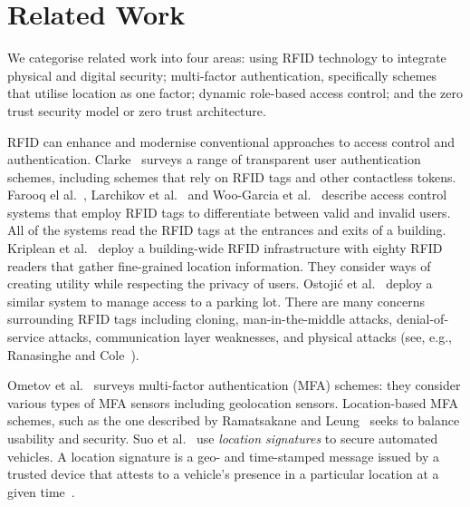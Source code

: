 \section{Related Work}\label{sec:related-work}

We categorise related work into four areas: using RFID technology to
integrate physical and digital security; multi-factor authentication,
specifically schemes that utilise location as one factor; dynamic
role-based access control; and the zero trust security model or zero
trust architecture.

RFID can enhance and modernise conventional approaches to access
control and authentication.  Clarke~\cite{clarke-11} surveys a range
of transparent user authentication schemes, including schemes that
rely on RFID tags and other contactless tokens.  Farooq el
al.~\cite{farooq-et-al-14}, Larchikov et al.~\cite{larchikov-et-al-14}
and Woo-Garcia et al.~\cite{woo-garcia-et-al-16} describe access
control systems that employ RFID tags to differentiate between valid
and invalid users.  All of the systems read the RFID tags at the
entrances and exits of a building.  Kriplean et
al.~\cite{kriplean-et-al-07} deploy a building-wide RFID
infrastructure with eighty RFID readers that gather fine-grained
location information.  They consider ways of creating utility while
respecting the privacy of users.  Ostoji\'c et
al.~\cite{ostojic-et-al-07} deploy a similar system to manage access
to a parking lot.  There are many concerns surrounding RFID tags
including cloning, man-in-the-middle attacks, denial-of-service
attacks, communication layer weaknesses, and physical attacks (see,
e.g., Ranasinghe and Cole~\cite{ranasinghe-cole-06}).

Ometov et al.~\cite{ometov-et-al-18} surveys multi-factor
authentication (MFA) schemes: they consider various types of MFA
sensors including geolocation sensors.  Location-based MFA schemes,
such as the one described by Ramatsakane and
Leung~\cite{ramatsakane-leung-17} seeks to balance usability and
security.  Suo et al.~\cite{suo-et-al-22} use \textit{location
  signatures} to secure automated vehicles.  A location signature is a
geo- and time-stamped message issued by a trusted device that attests
to a vehicle's presence in a particular location at a given
time~\cite{chen-et-al-09}.



